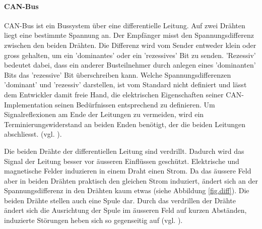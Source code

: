 \paragraph{CAN-Bus} CAN-Bus ist ein Bussystem über eine differentielle Leitung. Auf zwei Drähten liegt eine bestimmte Spannung an. Der Empfänger misst den Spannungsdifferenz zwischen den beiden Drähten. Die Differenz wird vom Sender entweder klein oder gross gehalten, um ein 'dominantes' oder ein 'rezessives' Bit zu senden. 'Rezessiv' bedeutet dabei, dass ein anderer Busteilnehmer durch anlegen eines 'dominanten' Bits das 'rezessive' Bit überschreiben kann. Welche Spannungsdifferenzen 'dominant' und 'rezessiv' darstellen, ist vom Standard nicht definiert und lässt dem Entwickler damit freie Hand, die elektrischen Eigenschaften seiner CAN-Implementation seinen Bedürfnissen entsprechend zu definieren. Um Signalreflexionen am Ende der Leitungen zu vermeiden, wird ein Terminierungswiderstand an beiden Enden benötigt, der die beiden Leitungen abschliesst. (vgl. \cite{boschcanspec2}).

Die beiden Drähte der differentiellen Leitung sind verdrillt. Dadurch wird das Signal der Leitung besser vor äusseren Einflüssen geschützt. Elektrische und magnetische Felder induzieren in einem Draht einen Strom. Da das äussere Feld aber in beiden Drähten praktisch den gleichen Strom induziert, ändert sich an der Spannungsdifferenz in den Drähten kaum etwas (siehe Abbildung \ref{fig.diff}). Die beiden Drähte stellen auch eine Spule dar. Durch das verdrillen der Drähte ändert sich die Ausrichtung der Spule im äusseren Feld auf kurzen Abständen, induzierte Störungen heben sich so gegenseitig auf (vgl. \cite[Kap. 2, S. 14]{muellerkt1}).

